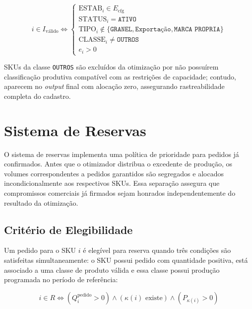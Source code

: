 \documentclass[11pt,a4paper]{article}
\begin{document}
\begin{equation}\label{eq:auto:016}
i \in I_{\text{válido}} \iff \begin{cases}
\text{ESTAB}_i \in E_{\text{cfg}} \\
\text{STATUS}_i = \texttt{ATIVO} \\
\text{TIPO}_i \notin \{\texttt{GRANEL}, \texttt{Exportação}, \texttt{MARCA PROPRIA}\} \\
\text{CLASSE}_i \neq \texttt{OUTROS} \\
e_i > 0
\end{cases}
\end{equation}

SKUs da classe \texttt{OUTROS} são excluídos da otimização por não possuírem
classificação produtiva compatível com as restrições de capacidade; contudo,
aparecem no \textit{output} final com alocação zero, assegurando rastreabilidade
completa do cadastro.

\section{Sistema de Reservas}

O sistema de reservas implementa uma política de prioridade para pedidos já
confirmados. Antes que o otimizador distribua o excedente de produção, os
volumes correspondentes a pedidos garantidos são segregados e alocados
incondicionalmente aos respectivos SKUs. Essa separação assegura que
compromissos comerciais já firmados sejam honrados independentemente do
resultado da otimização.

\subsection{Critério de Elegibilidade}

Um pedido para o SKU $i$ é elegível para reserva quando três condições são
satisfeitas simultaneamente: o SKU possui pedido com quantidade positiva, está
associado a uma classe de produto válida e essa classe possui produção
programada no período de referência:

\begin{equation}\label{eq:auto:017}
i \in R \iff (Q_i^{\text{pedido}} > 0) \land (\kappa(i) \text{ existe}) \land (P_{\kappa(i)} > 0)
\end{equation}
\end{document}
